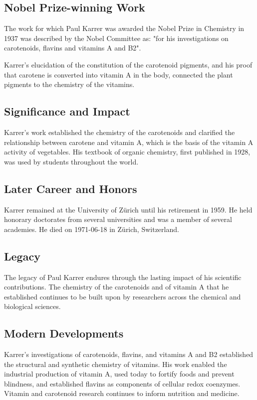 \subsection*{Nobel Prize-winning Work}

The work for which Paul Karrer was awarded the Nobel Prize in Chemistry in 1937 was described by the Nobel Committee as: "for his investigations on carotenoids, flavins and vitamins A and B2".

Karrer's elucidation of the constitution of the carotenoid pigments, and his proof that carotene is converted into vitamin A in the body, connected the plant pigments to the chemistry of the vitamins.

\subsection*{Significance and Impact}

Karrer's work established the chemistry of the carotenoids and clarified the relationship between carotene and vitamin A, which is the basis of the vitamin A activity of vegetables.
His textbook of organic chemistry, first published in 1928, was used by students throughout the world.

\subsection*{Later Career and Honors}

Karrer remained at the University of Zürich until his retirement in 1959.
He held honorary doctorates from several universities and was a member of several academies.
He died on 1971-06-18 in Zürich, Switzerland.

\subsection*{Legacy}

The legacy of Paul Karrer endures through the lasting impact of his scientific contributions.
The chemistry of the carotenoids and of vitamin A that he established continues to be built upon by researchers across the chemical and biological sciences.

\subsection*{Modern Developments}

Karrer's investigations of carotenoids, flavins, and vitamins A and B2 established the structural and synthetic chemistry of vitamins. His work enabled the industrial production of vitamin A, used today to fortify foods and prevent blindness, and established flavins as components of cellular redox coenzymes. Vitamin and carotenoid research continues to inform nutrition and medicine.

